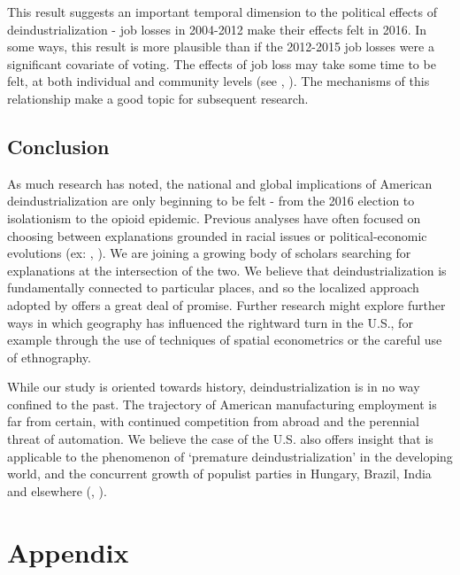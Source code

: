 \documentclass[]{AEA}
\begin{document}
This result suggests an important temporal dimension to the political
effects of deindustrialization - job losses in 2004-2012 make their
effects felt in 2016. In some ways, this result is more plausible than
if the 2012-2015 job losses were a significant covariate of voting. The
effects of job loss may take some time to be felt, at both individual
and community levels (see \cite{Mckee09}, \cite{Foote19}). The
mechanisms of this relationship make a good topic for subsequent
research.

\subsection{Conclusion}

As much research has noted, the national and global implications of
American deindustrialization are only beginning to be felt - from the
2016 election to isolationism to the opioid epidemic. Previous analyses
have often focused on choosing between explanations grounded in racial
issues or political-economic evolutions (ex: \cite{Green19},
\cite{Reny19}). We are joining a growing body of scholars searching for
explanations at the intersection of the two. We believe that
deindustrialization is fundamentally connected to particular places, and
so the localized approach adopted by \cite{Baccini21} offers a great
deal of promise. Further research might explore further ways in which
geography has influenced the rightward turn in the U.S., for example
through the use of techniques of spatial econometrics or the careful use
of ethnography.

While our study is oriented towards history, deindustrialization is in
no way confined to the past. The trajectory of American manufacturing
employment is far from certain, with continued competition from abroad
and the perennial threat of automation. We believe the case of the U.S.
also offers insight that is applicable to the phenomenon of `premature
deindustrialization' in the developing world, and the concurrent growth
of populist parties in Hungary, Brazil, India and elsewhere
(\cite{Rodrik15}, \cite{Castillo16}).

\nocite{Stargazer}




\appendix

\section{Appendix}
\end{document}
